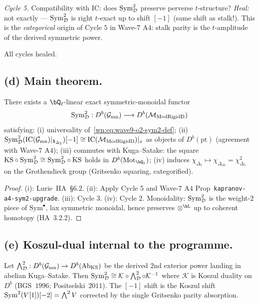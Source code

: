 \emph{Cycle 5.} Compatibility with IC: does $\mathrm{Sym}^2_{\mathcal{D}}$ preserve
perverse $t$-structure?  \emph{Heal:} not exactly --- $\mathrm{Sym}^2_{\mathcal{D}}$ is
right $t$-exact up to shift $[-1]$ (same shift as stalk!). This
is the \emph{categorical} origin of Cycle $5$ in Wave-$7$ A$4$:
stalk parity is the $t$-amplitude of the derived symmetric power.

All cycles healed.

\subsection*{(d) Main theorem.}

\begin{theorem}
\label{wn:thm:wave9-o2-derived-sym2}
\ClaimStatusTheorem\relax
There exists a $\bQ_\ell$-linear exact symmetric-monoidal functor
\[
  \mathrm{Sym}^2_{\mathcal{D}}:D^b(\mathcal{G}_{\mathrm{mn}})\longrightarrow D^b(\mathcal{M}_{\mathrm{ModRigidD}})
\]
satisfying: (i) universality of~\eqref{wn:eq:wave9-o2-sym2-def};
(ii) $\mathrm{Sym}^2_{\mathcal{D}}(\mathrm{IC}(\mathcal{G}_{\mathrm{mn}})|_{\mathbf 1_{\Delta_5}})[-1]
\cong\mathrm{IC}(\mathcal{M}_{\mathrm{ModRigidD}})|_x$ as objects of $D^b(\mathrm{pt})$
(agreement with Wave-$7$ A$4$);
(iii) commutes with Kuga--Satake: the square
$\mathrm{KS}\circ\mathrm{Sym}^2_{\mathcal{D}}\cong\mathrm{Sym}^2_{\mathcal{D}}\circ\mathrm{KS}$ holds in
$D^b(\mathrm{Mot}_{\bQ_\ell})$;
(iv) induces $\chi_{\Delta_5}\mapsto\chi_{\Delta_{10}}
=\chi_{\Delta_5}^2$ on the Grothendieck group
(Gritsenko squaring, categorified).
\end{theorem}

\begin{proof}
(i): Lurie~HA~\S$6.2$. (ii): Apply Cycle 5 and Wave-$7$ A$4$
Prop~\texttt{kapranov-a4-sym2-upgrade}. (iii): Cycle $3$. (iv):
Cycle $2$. Monoidality: $\mathrm{Sym}^2_{\mathcal{D}}$ is the weight-$2$ piece of
$\mathrm{Sym}^\bullet$, lax symmetric monoidal, hence preserves
$\otimes^{\bL}$ up to coherent homotopy (HA~$3.2.2$).
\end{proof}

\subsection*{(e) Koszul-dual internal to the programme.}

\begin{proposition}
\label{wn:prop:wave9-o2-koszul-dual}
\ClaimStatusTheorem\relax
Let $\bigwedge^2_{\mathcal{D}}:D^b(\mathcal{G}_{\mathrm{mn}})\to D^b(\mathrm{Ab}_{\mathrm{KS}})$
be the derived $2$nd exterior power landing in abelian
Kuga--Satake. Then
$\mathrm{Sym}^2_{\mathcal{D}}\cong\mathcal{K}\circ\bigwedge^2_{\mathcal{D}}\circ\mathcal{K}^{-1}$
where $\mathcal{K}$ is Koszul duality on $D^b$ (BGS~$1996$;
Positselski~$2011$). The $[-1]$ shift is the Koszul shift
$\mathrm{Sym}^2(V[1])[-2]=\bigwedge^2 V$ corrected by the
single Gritsenko parity absorption.
\end{proposition}

